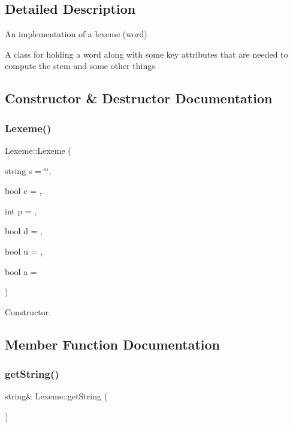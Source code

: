 \subsection{Detailed Description}
An implementation of a lexeme (word) 

A class for holding a word along with some key attributes that are needed to compute the stem and some other things 

\subsection{Constructor \& Destructor Documentation}
\mbox{\label{class_lexeme_a91ec217d9cc9c11b33597705b1f2ef88}} 
\subsubsection{\texorpdfstring{Lexeme()}{Lexeme()}}
{\footnotesize\ttfamily Lexeme\+::\+Lexeme (\begin{DoxyParamCaption}\item[{string}]{s = {\ttfamily \char`\"{}\char`\"{}},  }\item[{bool}]{c = {},  }\item[{int}]{p = {},  }\item[{bool}]{d = {},  }\item[{bool}]{u = {},  }\item[{bool}]{a = {} }\end{DoxyParamCaption})\hspace{0.3cm}{\ttfamily [inline]}}



Constructor. 



\subsection{Member Function Documentation}
\mbox{\label{class_lexeme_ac3bedb54fb40b5b7d85edb3cf2d715db}} 
\subsubsection{\texorpdfstring{get\+String()}{getString()}}
{\footnotesize\ttfamily string\& Lexeme\+::get\+String (\begin{DoxyParamCaption}{ }\end{DoxyParamCaption})\hspace{0.3cm}{\ttfamily [inline]}}


